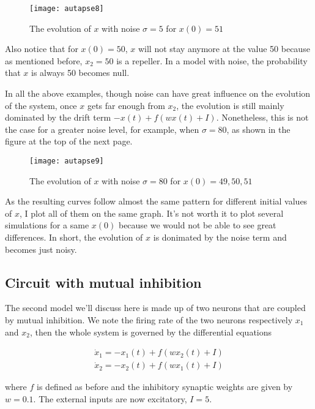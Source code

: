 \vspace{-1em}
\begin{figure}[H]
  \centering
  \texttt{[image: autapse8]}
  \caption{The evolution of $x$ with noise $\sigma = 5$ for $x(0) = 51$}
\end{figure}

Also notice that for $x(0) = 50$, $x$ will not stay anymore at the value 50 
because as mentioned before, $x_2 = 50$ is a repeller. In a model with noise,
the probability that $x$ is always 50 becomes null. 

In all the above examples, though noise can have great influence on the 
evolution of the system, once $x$ gets far enough from $x_2$, the evolution
is still mainly dominated by the drift term $-x(t) + f(wx(t)+I)$.
Nonetheless, this is not the case for a greater noise level, for example,
when $\sigma = 80$, as shown in the figure at the top of the next page.

\vspace{-1em}
\begin{figure}[H]
  \centering
  \texttt{[image: autapse9]}
  \caption
    {The evolution of $x$ with noise $\sigma = 80$ for $x(0) = 49, 50, 51$}
\end{figure}

As the resulting curves follow almost the same pattern for different 
initial values of $x$, I plot all of them on the same graph. It's not worth
it to plot several simulations for a same $x(0)$ because we would not be able
to see great differences. In short, the evolution of $x$ is donimated by
the noise term and becomes just noisy.

\subsection{Circuit with mutual inhibition}

The second model we'll discuss here is made up of two neurons that are coupled
by mutual inhibition. We note the firing rate of the two neurons respectively
$x_1$ and $x_2$, then the whole system is governed by the differential
equations

\begin{gather*}
  \dot{x}_1 = -x_1(t) + f(wx_2(t) + I)\\
  \dot{x}_2 = -x_2(t) + f(wx_1(t) + I)
\end{gather*}

\noindent
where $f$ is defined as before and the inhibitory synaptic weights are given
by $w = 0.1$. The external inputs are now excitatory, $I = 5$.


